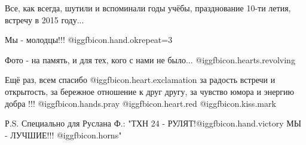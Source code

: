 Все, как всегда, шутили и вспоминали годы учёбы, празднование 10-ти летия,
встречу в 2015 году...

Мы - молодцы!!! @igg{fbicon.hand.ok}{repeat=3} 

Фото - на память, и для тех, кого с нами не было... @igg{fbicon.hearts.revolving} 

Ещё раз, всем спасибо @igg{fbicon.heart.exclamation} за радость встречи и открытость, за бережное отношение к
друг другу, за чувство юмора и энергию добра !!! @igg{fbicon.hands.pray} @igg{fbicon.heart.red} @igg{fbicon.kiss.mark} 

Р.S. Специально для Руслана Ф.: "ТХН 24 - РУЛЯТ!@igg{fbicon.hand.victory} МЫ - ЛУЧШИЕ!!! @igg{fbicon.horns}"

